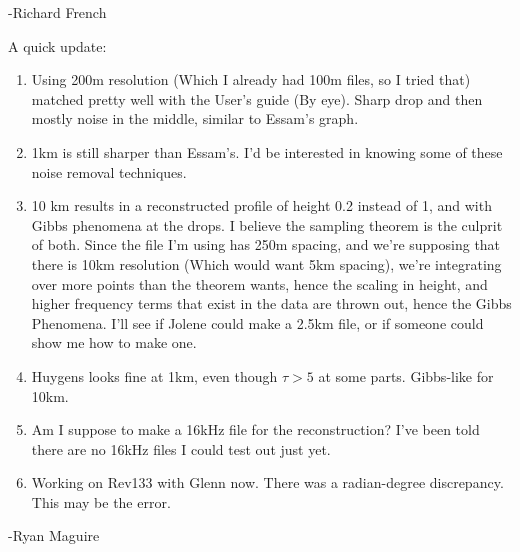 \documentclass[crop=false,class=article,oneside]{standalone}
\begin{document}
-Richard French\par
A quick update:
\begin{enumerate}
    \item Using 200m resolution (Which I already had 100m files, so I tried that) matched pretty well with the User's guide (By eye). Sharp drop and then mostly noise in the middle, similar to Essam's graph.
    \item 1km is still sharper than Essam's. I'd be interested in knowing some of these noise removal techniques.
    \item 10 km results in a reconstructed profile of height 0.2 instead of 1, and with Gibbs phenomena at the drops. I believe the sampling theorem is the culprit of both. Since the file I'm using has 250m spacing, and we're supposing that there is 10km resolution (Which would want 5km spacing), we're integrating over more points than the theorem wants, hence the scaling in height, and higher frequency terms that exist in the data are thrown out, hence the Gibbs Phenomena. I'll see if Jolene could make a 2.5km file, or if someone could show me how to make one.
    \item Huygens looks fine at 1km, even though $\tau>5$ at some parts. Gibbs-like for 10km.
    \item Am I suppose to make a 16kHz file for the reconstruction? I've been told there are no 16kHz files I could test out just yet.
    \item Working on Rev133 with Glenn now. There was a radian-degree discrepancy. This may be the error.
\end{enumerate}
-Ryan Maguire
\end{document}
